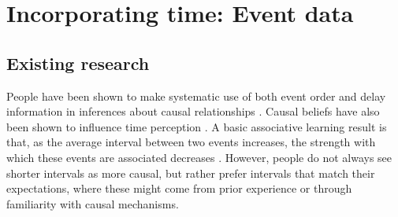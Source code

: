 \documentclass{cambridge7A}%
\begin{document}

\section{Incorporating time: Event data}\label{section:DN}

\subsection{Existing research}

People have been shown to make systematic use of both event order \citep{bramley2014order} and delay information in inferences about causal relationships \citep{buehner2003rethinking,buehner2004abolishing,buehner2006temporal}. Causal beliefs have also been shown to influence time perception \citep{bechlivanidis2013does,buehner2009causal,haggard2002voluntary}.  A basic associative learning result is that, as the average interval between two events increases, the strength with which these events are associated decreases \citep{wolfe1921effect,shanks1987associative, grice1948relation}.  However, people do not always see shorter intervals as more causal, but rather prefer intervals that match their expectations, where these might come from prior experience or through familiarity with causal mechanisms.  
\end{document}
